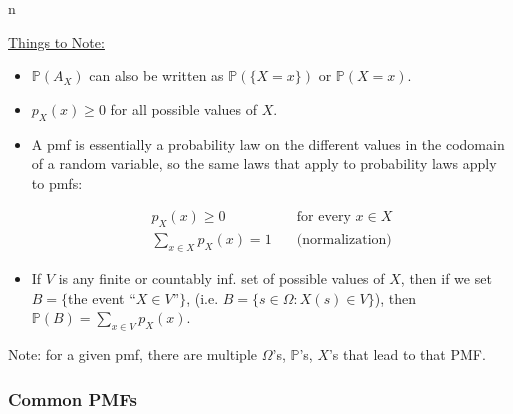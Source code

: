 n\documentclass{article}
\begin{document}
\bigskip
\underline{Things to Note:}

\begin{itemize}
\item $\mathbb{P}(A_X)$ can also be written as $\mathbb{P}(\{X = x\})$
  or $\mathbb{P}(X = x)$.

\item $p_X(x) \geq 0$ for all possible values of $X$.

\item A pmf is essentially a probability law on the different values
  in the codomain of a random variable, so the same laws that apply
  to probability laws apply to pmfs:

  \[
    \begin{aligned}
      p_X(x) \ge 0 & \quad \text{for every } x \in X \\
      \sum\limits_{x \in X} p_X(x) = 1 & \quad \text{(normalization)}
    \end{aligned}
  \]

\item If $V$ is any finite or countably inf. set of possible values of
  $X$, then if we set $B = \{ $the event ``$X \in V$''$\}$,
  (i.e. $B = \{ s \in \Omega : X(s) \in V \} $), then
  $\mathbb{P}(B) = \sum\limits_{x \in V} p_X(x)$.
\end{itemize}

Note: for a given pmf, there are multiple $\Omega$'s, $\mathbb{P}$'s,
$X$'s that lead to that PMF.

\subsubsection{Common PMFs}
\end{document}
